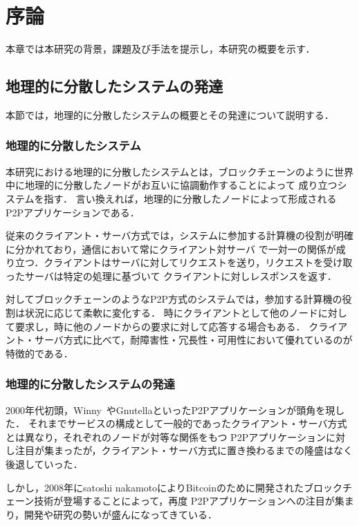 \chapter{序論}
\label{introduction}

本章では本研究の背景，課題及び手法を提示し，本研究の概要を示す．

\section{地理的に分散したシステムの発達}
\label{introduction:system-growth}

本節では，地理的に分散したシステムの概要とその発達について説明する．

\subsection{地理的に分散したシステム}

本研究における地理的に分散したシステムとは，ブロックチェーンのように世界中に地理的に分散したノードがお互いに協調動作することによって
成り立つシステムを指す．
言い換えれば，地理的に分散したノードによって形成されるP2Pアプリケーションである．

従来のクライアント・サーバ方式では，システムに参加する計算機の役割が明確に分かれており，通信において常にクライアント対サーバ
で一対一の関係が成り立つ．クライアントはサーバに対してリクエストを送り，リクエストを受け取ったサーバは特定の処理に基づいて
クライアントに対しレスポンスを返す．

対してブロックチェーンのようなP2P方式のシステムでは，参加する計算機の役割は状況に応じて柔軟に変化する．
時にクライアントとして他のノードに対して要求し，時に他のノードからの要求に対して応答する場合もある．
クライアント・サーバ方式に比べて，耐障害性・冗長性・可用性において優れているのが特徴的である．

\subsection{地理的に分散したシステムの発達}

2000年代初頭，Winny~\cite{Winny}やGnutellaといったP2Pアプリケーションが頭角を現した．
それまでサービスの構成として一般的であったクライアント・サーバ方式とは異なり，それぞれのノードが対等な関係をもつ
P2Pアプリケーションに対し注目が集まったが，クライアント・サーバ方式に置き換わるまでの隆盛はなく後退していった．

しかし，2008年にsatoshi nakamotoによりBitcoinのために開発されたブロックチェーン技術が登場することによって，再度
P2Pアプリケーションへの注目が集まり，開発や研究の勢いが盛んになってきている．

